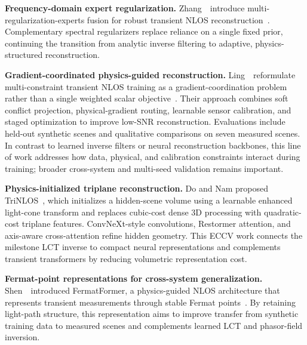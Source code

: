 \vspace{0.8mm}
\noindent \textbf{Frequency-domain expert regularization.}
Zhang~\etal~introduce multi-regularization-experts fusion for robust transient NLOS reconstruction~\cite{zhangFMoENLOS2026}. Complementary spectral regularizers replace reliance on a single fixed prior, continuing the transition from analytic inverse filtering to adaptive, physics-structured reconstruction.

\vspace{0.8mm}
\noindent \textbf{Gradient-coordinated physics-guided reconstruction.}
Ling~\etal~reformulate multi-constraint transient NLOS training as a gradient-coordination problem rather than a single weighted scalar objective~\cite{lingSymmetryAwareGradientNLOS2026}. Their approach combines soft conflict projection, physical-gradient routing, learnable sensor calibration, and staged optimization to improve low-SNR reconstruction. Evaluations include held-out synthetic scenes and qualitative comparisons on seven measured scenes. In contrast to learned inverse filters or neural reconstruction backbones, this line of work addresses how data, physical, and calibration constraints interact during training; broader cross-system and multi-seed validation remains important.

\vspace{0.8mm}
\noindent \textbf{Physics-initialized triplane reconstruction.}
Do and Nam proposed TriNLOS~\cite{doTriNLOS2026}, which initializes a hidden-scene volume using a learnable enhanced light-cone transform and replaces cubic-cost dense 3D processing with quadratic-cost triplane features. ConvNeXt-style convolutions, Restormer attention, and axis-aware cross-attention refine hidden geometry. This ECCV work connects the milestone LCT inverse to compact neural representations and complements transient transformers by reducing volumetric representation cost.

\vspace{0.8mm}
\noindent \textbf{Fermat-point representations for cross-system generalization.}
Shen~\etal~introduced FermatFormer, a physics-guided NLOS architecture that represents transient measurements through stable Fermat points~\cite{shenFermatFormer2026}. By retaining light-path structure, this representation aims to improve transfer from synthetic training data to measured scenes and complements learned LCT and phasor-field inversion.

